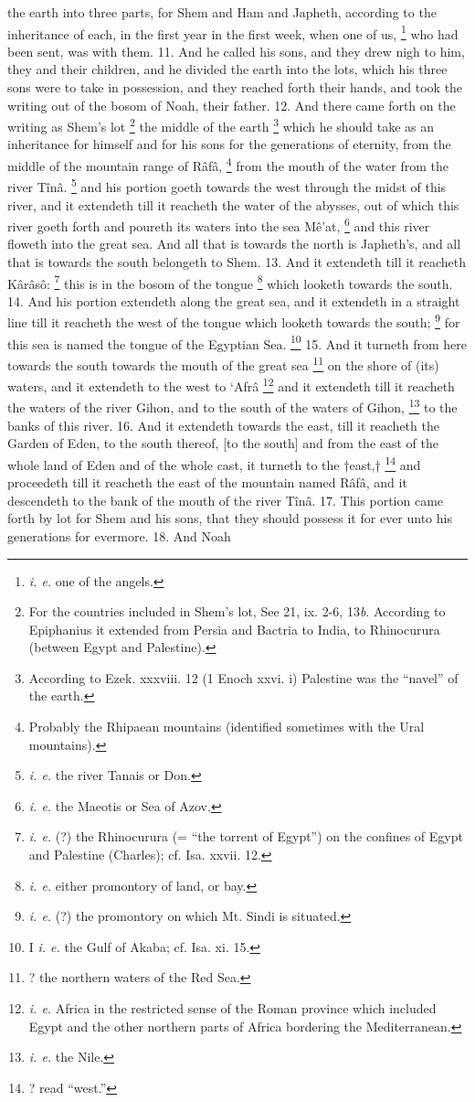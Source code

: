 the earth into three parts, for Shem and Ham and Japheth, according to the inheritance of each, in the first year in the first week, when one of us, \footnote{\emph{i. e.} one of the angels.} who had been sent, was with them. 11. And he called his sons, and they drew nigh to him, they and their children, and he divided the earth into the lots, which his three sons were to take in possession, and they reached forth their hands, and took the writing out of the bosom of Noah, their father. 12. And there came forth on the writing as Shem's lot \footnote{For the countries included in Shem's lot, See 21, ix. 2-6, 13\emph{b}. According to Epiphanius it extended from Persia and Bactria to India, to Rhinocurura (between Egypt and Palestine).} the middle of the earth \footnote{According to Ezek. xxxviii. 12 (1 Enoch xxvi. i) Palestine was the ``navel'' of the earth.} which he should take as an inheritance for himself and for his sons for the generations of eternity, from the middle of the mountain range of Râfâ, \footnote{Probably the Rhipaean mountains (identified sometimes with the Ural mountains).} from the mouth of the water from the river Tînâ. \footnote{\emph{i. e.} the river Tanais or Don.} and his portion goeth towards the west through the midst of this river, and it extendeth till it reacheth the water of the abysses, out of which this river goeth forth and poureth its waters into the sea Mê’at, \footnote{\emph{i. e.} the Maeotis or Sea of Azov.} and this river floweth into the great sea. And all that is towards the north is Japheth's, and all that is towards the south belongeth to Shem. 13. And it extendeth till it reacheth Kârâsô: \footnote{\emph{i. e.} (?) the Rhinocurura (= ``the torrent of Egypt'') on the confines of Egypt and Palestine (Charles); cf. Isa. xxvii. 12.} this is in the bosom of the tongue \footnote{\emph{i. e.} either promontory of land, or bay.} which looketh towards the south. 14. And his portion extendeth along the great sea, and it extendeth in a straight line till it reacheth the west of the tongue which looketh towards the south; \footnote{\emph{i. e.} (?) the promontory on which Mt. Sindi is situated.} for this sea is named the tongue of the Egyptian Sea. \footnote{I \emph{i}\emph{. e.} the Gulf of Akaba; cf. Isa. xi. 15.} 15. And it turneth from here towards the south towards the mouth of the great sea \footnote{? the northern waters of the Red Sea.} on the shore of (its) waters, and it extendeth to the west to ‘Afrâ \footnote{\emph{i. e.} Africa in the restricted sense of the Roman province which included Egypt and the other northern parts of Africa bordering the Mediterranean.} and it extendeth till it reacheth the waters of the river Gihon, and to the south of the waters of Gihon, \footnote{\emph{i. e.} the Nile.} to the banks of this river. 16. And it extendeth towards the east, till it reacheth the Garden of Eden, to the south thereof, [to the south] and from the east of the whole land of Eden and of the whole cast, it turneth to the †east,† \footnote{? read ``west.''} and proceedeth till it reacheth the east of the mountain named Râfâ, and it descendeth to the bank of the mouth of the river Tînâ. 17. This portion came forth by lot for Shem and his sons, that they should possess it for ever unto his generations for evermore. 18. And Noah 